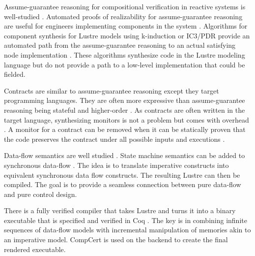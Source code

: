 Assume-guarantee reasoning for compositional verification in reactive systems is well-studied \cite{10.1007/978-3-642-28891-3_13, agree2013, 10.1145/2658982.2527272, 10.1007/978-3-319-17524-9_7}. Automated proofs of realizability for assume-guarantee reasoning are useful for engineers implementing components in the system \cite{10.1007/978-3-319-17524-9_13, 10.1007/978-3-319-29613-5_7}. Algorithms for %
component synthesis for Lustre models using k-induction or IC3/PDR provide an automated path from the assume-guarantee reasoning to an actual satisfying node implementation \cite{katis2017synthesis, 10.1007/978-3-319-89963-3_10}. These algorithms synthesize code in the Lustre modeling language but do not provide a path to a low-level implementation that could be fielded.

Contracts are similar to assume-guarantee reasoning except they target programming languages. They are often more expressive than assume-guarantee reasoning being stateful and higher-order \cite{10.1145/583852.581484}. As contracts are often written in the target language, synthesizing monitors is not a problem but comes with %
overhead \cite{10.1007/978-3-642-28869-2_11}. A monitor for a contract can be removed when it can be statically proven that the code preserves the contract under all possible inputs and executions \cite{10.1145/3158139}.

Data-flow semantics are well studied \cite{10.1145/41625.41641,97300, 10.1145/1379023.1375674,10.1145/2345141.2248426,10.1007/978-3-540-45212-6_10}. State machine semantics can be added to synchronous data-flow \cite{10.1145/1086228.1086261}. The idea is to translate imperative constructs into equivalent synchronous data flow constructs. The resulting Lustre can then be compiled. The goal is to provide a seamless connection between pure data-flow and pure control design.

There is a fully verified compiler that takes Lustre and turns it into a binary executable that is specified and verified in Coq \cite{10.1145/3140587.3062358}. The key is in combining infinite sequences of data-flow models with incremental manipulation of memories akin to an imperative model. CompCert is used on the backend to create the final rendered executable.